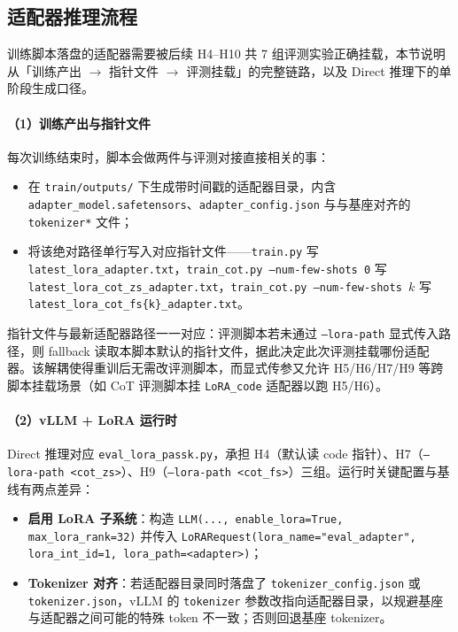 \subsection{适配器推理流程}

训练脚本落盘的适配器需要被后续 H4--H10 共 7 组评测实验正确挂载，本节说明从「训练产出 $\to$ 指针文件 $\to$ 评测挂载」的完整链路，以及 Direct 推理下的单阶段生成口径。

\paragraph{（1）训练产出与指针文件}
每次训练结束时，脚本会做两件与评测对接直接相关的事：
\begin{itemize}
    \item 在 \texttt{train/outputs/} 下生成带时间戳的适配器目录，内含 \texttt{adapter\_model.safetensors}、\texttt{adapter\_config.json} 与与基座对齐的 \texttt{tokenizer*} 文件；
    \item 将该绝对路径单行写入对应指针文件——\texttt{train.py} 写 \texttt{latest\_lora\_adapter.txt}，\texttt{train\_cot.py --num-few-shots 0} 写 \texttt{latest\_lora\_cot\_zs\_adapter.txt}，\texttt{train\_cot.py --num-few-shots $k$} 写 \texttt{latest\_lora\_cot\_fs\{k\}\_adapter.txt}。
\end{itemize}
指针文件与最新适配器路径一一对应：评测脚本若未通过 \texttt{--lora-path} 显式传入路径，则 fallback 读取本脚本默认的指针文件，据此决定此次评测挂载哪份适配器。该解耦使得重训后无需改评测脚本，而显式传参又允许 H5/H6/H7/H9 等跨脚本挂载场景（如 CoT 评测脚本挂 \texttt{LoRA\_code} 适配器以跑 H5/H6）。

\paragraph{（2）vLLM + LoRA 运行时}
Direct 推理对应 \texttt{eval\_lora\_passk.py}，承担 H4（默认读 code 指针）、H7（\texttt{--lora-path <cot\_zs>}）、H9（\texttt{--lora-path <cot\_fs>}）三组。运行时关键配置与基线有两点差异：
\begin{itemize}
    \item \textbf{启用 LoRA 子系统}：构造 \texttt{LLM(..., enable\_lora=True, max\_lora\_rank=32)} 并传入 \texttt{LoRARequest(lora\_name="eval\_adapter", lora\_int\_id=1, lora\_path=<adapter>)}；
    \item \textbf{Tokenizer 对齐}：若适配器目录同时落盘了 \texttt{tokenizer\_config.json} 或 \texttt{tokenizer.json}，vLLM 的 \texttt{tokenizer} 参数改指向适配器目录，以规避基座与适配器之间可能的特殊 token 不一致；否则回退基座 tokenizer。
\end{itemize}

